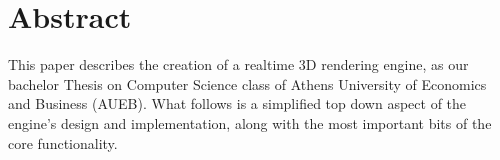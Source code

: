 \section{Abstract}

This paper describes the creation of a realtime 3D rendering engine, as our bachelor Thesis on Computer Science
class of Athens University of Economics and Business (AUEB). What follows is a simplified top down aspect of the
engine's design and implementation, along with the most important bits of the core functionality.

